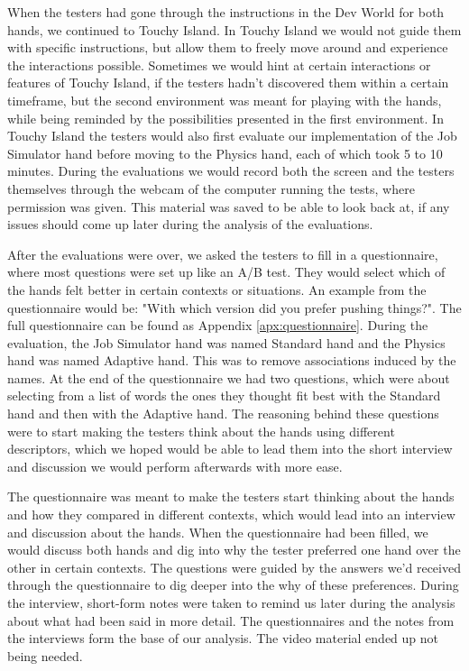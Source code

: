 When the testers had gone through the instructions in the Dev World for both hands, we continued to Touchy Island. In Touchy Island we would not guide them with specific instructions, but allow them to freely move around and experience the interactions possible. Sometimes we would hint at certain interactions or features of Touchy Island, if the testers hadn't discovered them within a certain timeframe, but the second environment was meant for playing with the hands, while being reminded by the possibilities presented in the first environment. In Touchy Island the testers would also first evaluate our implementation of the Job Simulator hand before moving to the Physics hand, each of which took 5 to 10 minutes. During the evaluations we would record both the screen and the testers themselves through the webcam of the computer running the tests, where permission was given. This material was saved to be able to look back at, if any issues should come up later during the analysis of the evaluations.

After the evaluations were over, we asked the testers to fill in a questionnaire, where most questions were set up like an A/B test. They would select which of the hands felt better in certain contexts or situations. An example from the questionnaire would be: "With which version did you prefer pushing things?". The full questionnaire can be found as Appendix \ref{apx:questionnaire}. During the evaluation, the Job Simulator hand was named Standard hand and the Physics hand was named Adaptive hand. This was to remove associations induced by the names. At the end of the questionnaire we had two questions, which were about selecting from a list of words the ones they thought fit best with the Standard hand and then with the Adaptive hand. The reasoning behind these questions were to start making the testers think about the hands using different descriptors, which we hoped would be able to lead them into the short interview and discussion we would perform afterwards with more ease.

The questionnaire was meant to make the testers start thinking about the hands and how they compared in different contexts, which would lead into an interview and discussion about the hands. When the questionnaire had been filled, we would discuss both hands and dig into why the tester preferred one hand over the other in certain contexts. The questions were guided by the answers we'd received through the questionnaire to dig deeper into the why of these preferences. During the interview, short-form notes were taken to remind us later during the analysis about what had been said in more detail. The questionnaires and the notes from the interviews form the base of our analysis. The video material ended up not being needed.


